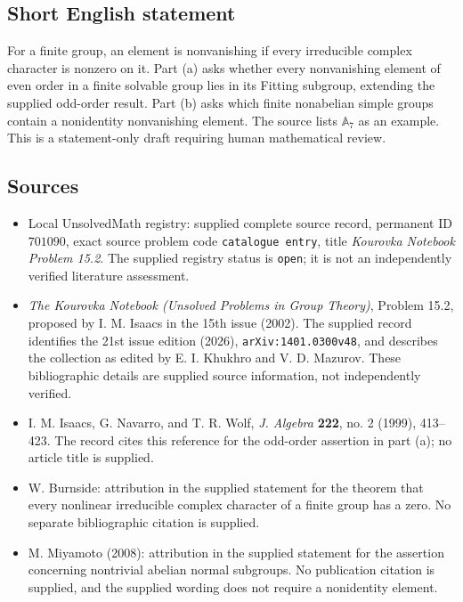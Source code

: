 \documentclass[11pt]{article}
\begin{document}
\subsection{Short English statement}
For a finite group, an element is nonvanishing if every irreducible complex character is nonzero on it. Part (a) asks whether every nonvanishing element of even order in a finite solvable group lies in its Fitting subgroup, extending the supplied odd-order result. Part (b) asks which finite nonabelian simple groups contain a nonidentity nonvanishing element. The source lists \(\mathbb{A}_7\) as an example. This is a statement-only draft requiring human mathematical review.
\subsection{Sources}
\begin{itemize}
\item Local UnsolvedMath registry: supplied complete source record, permanent ID \(701090\), exact source problem code \texttt{catalogue entry}, title \emph{Kourovka Notebook Problem 15.2}. The supplied registry status is \texttt{open}; it is not an independently verified literature assessment.
\item \emph{The Kourovka Notebook (Unsolved Problems in Group Theory)}, Problem 15.2, proposed by I. M. Isaacs in the 15th issue (2002). The supplied record identifies the 21st issue edition (2026), \texttt{arXiv:1401.0300v48}, and describes the collection as edited by E. I. Khukhro and V. D. Mazurov. These bibliographic details are supplied source information, not independently verified.
\item I. M. Isaacs, G. Navarro, and T. R. Wolf, \emph{J. Algebra} \textbf{222}, no. 2 (1999), 413--423. The record cites this reference for the odd-order assertion in part (a); no article title is supplied.
\item W. Burnside: attribution in the supplied statement for the theorem that every nonlinear irreducible complex character of a finite group has a zero. No separate bibliographic citation is supplied.
\item M. Miyamoto (2008): attribution in the supplied statement for the assertion concerning nontrivial abelian normal subgroups. No publication citation is supplied, and the supplied wording does not require a nonidentity element.
\end{itemize}
\end{document}

